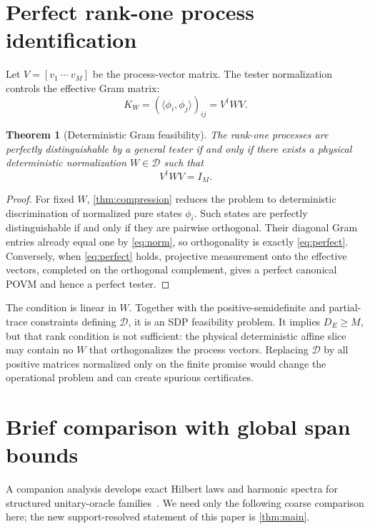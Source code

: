 \documentclass[11pt]{article}
\newtheorem{theorem}{Theorem}[section]
\theoremstyle{definition}
\theoremstyle{remark}
\newcommand{\cD}{\mathcal D}
\begin{document}
\section{Perfect rank-one process identification}

Let $V=[v_1\ \cdots\ v_M]$ be the process-vector matrix.  The tester
normalization controls the effective Gram matrix:
\begin{equation}
       K_W=(\langle\phi_i,\phi_j\rangle)_{ij}=V^\dagger WV.      \label{eq:gram}
\end{equation}

\begin{theorem}[Deterministic Gram feasibility]\label{thm:perfect}
The rank-one processes are perfectly distinguishable by a general tester if
and only if there exists a physical deterministic normalization $W\in\cD$
such that
\begin{equation}
                              V^\dagger WV=I_M.           \label{eq:perfect}
\end{equation}
\end{theorem}

\begin{proof}
For fixed $W$, \cref{thm:compression} reduces the problem to deterministic
discrimination of normalized pure states $\phi_i$.  Such states are perfectly
distinguishable if and only if they are pairwise orthogonal.  Their diagonal
Gram entries already equal one by \cref{eq:norm}, so orthogonality is exactly
\cref{eq:perfect}.  Conversely, when \cref{eq:perfect} holds, projective
measurement onto the effective vectors, completed on the orthogonal
complement, gives a perfect canonical POVM and hence a perfect tester.
\end{proof}

The condition is linear in $W$.  Together with the positive-semidefinite and
partial-trace constraints defining $\cD$, it is an SDP feasibility problem.
It implies $D_E\geq M$, but that rank condition is not sufficient: the
physical deterministic affine slice may contain no $W$ that orthogonalizes
the process vectors.  Replacing $\cD$ by all positive matrices normalized only
on the finite promise would change the operational problem and can create
spurious certificates.

\section{Brief comparison with global span bounds}

A companion analysis develops exact Hilbert laws and harmonic spectra for
structured unitary-oracle families~\cite{eriksson2026oracle}.  We need only the
following coarse comparison here; the new support-resolved statement of this
paper is \cref{thm:main}.
\end{document}
